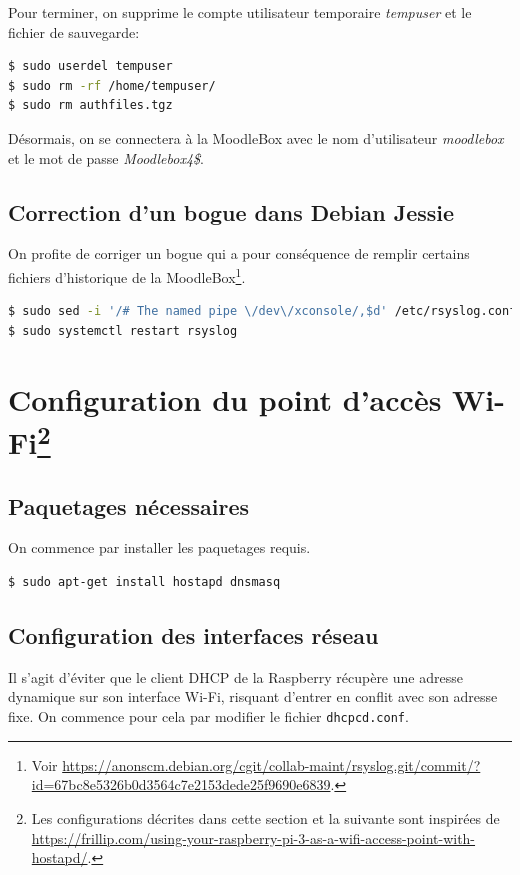 \documentclass[11pt]{article}
\begin{document}
Pour terminer, on supprime le compte utilisateur temporaire \emph{tempuser} et le fichier de sauvegarde:
\begin{lstlisting}[language=bash]
$ sudo userdel tempuser
$ sudo rm -rf /home/tempuser/
$ sudo rm authfiles.tgz
\end{lstlisting}

Désormais, on se connectera à la MoodleBox avec le nom d'utilisateur \emph{moodlebox} et le mot de passe \emph{Moodlebox4\$}.

\subsection{Correction d'un bogue dans Debian Jessie}

On profite de corriger un bogue qui a pour conséquence de remplir certains fichiers d'historique de la MoodleBox\footnote{Voir \url{https://anonscm.debian.org/cgit/collab-maint/rsyslog.git/commit/?id=67bc8e5326b0d3564c7e2153dede25f9690e6839}.}.

\begin{lstlisting}[language=bash]
$ sudo sed -i '/# The named pipe \/dev\/xconsole/,$d' /etc/rsyslog.conf
$ sudo systemctl restart rsyslog
\end{lstlisting}

\section[Configuration du point d'accès Wi-Fi]{Configuration du point d'accès Wi-Fi\footnote{Les configurations décrites dans cette section et la suivante sont inspirées de \url{https://frillip.com/using-your-raspberry-pi-3-as-a-wifi-access-point-with-hostapd/}.}}

\subsection{Paquetages nécessaires}

On commence par installer les paquetages requis.
\begin{lstlisting}[language=bash]
$ sudo apt-get install hostapd dnsmasq
\end{lstlisting}

\subsection{Configuration des interfaces réseau}

Il s'agit d'éviter que le client DHCP de la Raspberry récupère une adresse dynamique sur son interface Wi-Fi, risquant d'entrer en conflit avec son adresse fixe. On commence pour cela par modifier le fichier \lstinline{dhcpcd.conf}.
\end{document}
